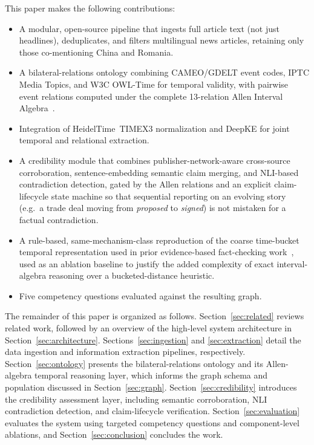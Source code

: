 \documentclass[conference]{IEEEtran}
\begin{document}
This paper makes the following contributions:
\begin{itemize}
  \item A modular, open-source pipeline that ingests full article text
        (not just headlines), deduplicates, and filters multilingual news
        articles, retaining only those co-mentioning China and Romania.
  \item A bilateral-relations ontology combining CAMEO/GDELT event codes,
        IPTC Media Topics, and W3C OWL-Time for temporal validity, with
        pairwise event relations computed under the complete 13-relation
        Allen Interval Algebra~\cite{allen1983interval}.
  \item Integration of HeidelTime~TIMEX3 normalization and DeepKE for
        joint temporal and relational extraction.
  \item A credibility module that combines publisher-network-aware
        cross-source corroboration, sentence-embedding semantic claim
        merging, and NLI-based contradiction detection, gated by the
        Allen relations and an explicit claim-lifecycle state machine so
        that sequential reporting on an evolving story (e.g.\ a trade deal
        moving from \emph{proposed} to \emph{signed}) is not mistaken for
        a factual contradiction.
  \item A rule-based, same-mechanism-class reproduction of the coarse
        time-bucket temporal representation used in prior evidence-based
        fact-checking work~\cite{allein2023implicit}, used as an ablation
        baseline to justify the added complexity of exact interval-algebra
        reasoning over a bucketed-distance heuristic.
  \item Five competency questions evaluated against the resulting graph.
\end{itemize}

The remainder of this paper is organized as follows. Section~\ref{sec:related} reviews related work, followed by an overview of the high-level system architecture in Section~\ref{sec:architecture}. Sections~\ref{sec:ingestion} and \ref{sec:extraction} detail the data ingestion and information extraction pipelines, respectively. Section~\ref{sec:ontology} presents the bilateral-relations ontology and its Allen-algebra temporal reasoning layer, which informs the graph schema and population discussed in Section~\ref{sec:graph}. Section~\ref{sec:credibility} introduces the credibility assessment layer, including semantic corroboration, NLI contradiction detection, and claim-lifecycle verification. Section~\ref{sec:evaluation} evaluates the system using targeted competency questions and component-level ablations, and Section~\ref{sec:conclusion} concludes the work.
\end{document}
